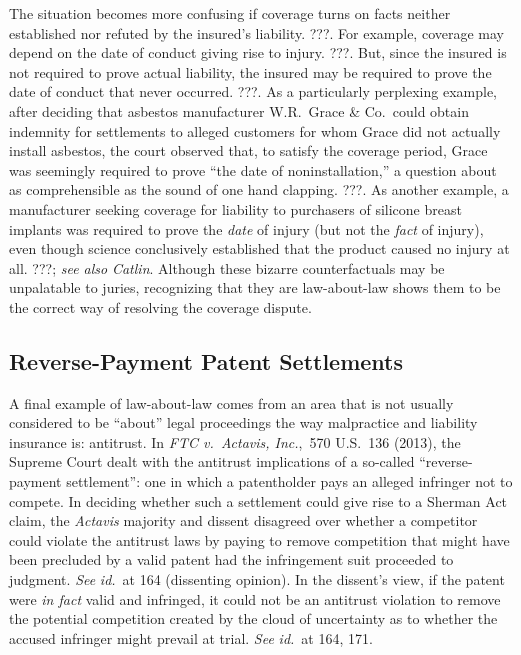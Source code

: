 \documentclass[
  12pt,
  letterpaper,
]{scrartcl}
\begin{document}
The situation becomes more confusing if coverage turns on facts neither
established nor refuted by the insured's liability. ???. For example, coverage
may depend on the date of conduct giving rise to injury. ???. But, since the
insured is not required to prove actual liability, the insured may be required
to prove the date of conduct that never occurred. ???. As a particularly
perplexing example, after deciding that asbestos manufacturer W.R.~Grace \&
Co.~could obtain indemnity for settlements to alleged customers for whom Grace
did not actually install asbestos, the court observed that, to satisfy the
coverage period, Grace was seemingly required to prove ``the date of
noninstallation,'' a question about as comprehensible as the sound of one hand
clapping. ???. As another example, a manufacturer seeking coverage for
liability to purchasers of silicone breast implants was required to prove the
\emph{date} of injury (but not the \emph{fact} of injury), even though science
conclusively established that the product caused no injury at all. ???;
\textit{see also} \textit{Catlin}. Although these bizarre counterfactuals may
be unpalatable to juries, recognizing that they are law-about-law shows them to
be the correct way of resolving the coverage dispute.


\subsection{Reverse-Payment Patent Settlements}

A final example of law-about-law comes from an area that is not usually
considered to be ``about'' legal proceedings the way malpractice and liability
insurance is: antitrust. In \textit{FTC v.~Actavis, Inc.},~570 U.S.~136 (2013),
the Supreme Court dealt with the antitrust implications of a so-called
``reverse-payment settlement'': one in which a patentholder pays an alleged
infringer not to compete. In deciding whether such a settlement could give rise
to a Sherman Act claim, the \textit{Actavis} majority and dissent disagreed
over whether a competitor could violate the antitrust laws by paying to remove
competition that might have been precluded by a valid patent had the
infringement suit proceeded to judgment. \textit{See} \textit{id.}~at 164
(dissenting opinion). In the dissent's view, if the patent were \emph{in fact}
valid and infringed, it could not be an antitrust violation to remove the
potential competition created by the cloud of uncertainty as to whether the
accused infringer might prevail at trial. \textit{See} \textit{id.}~at 164, 171.
\end{document}
